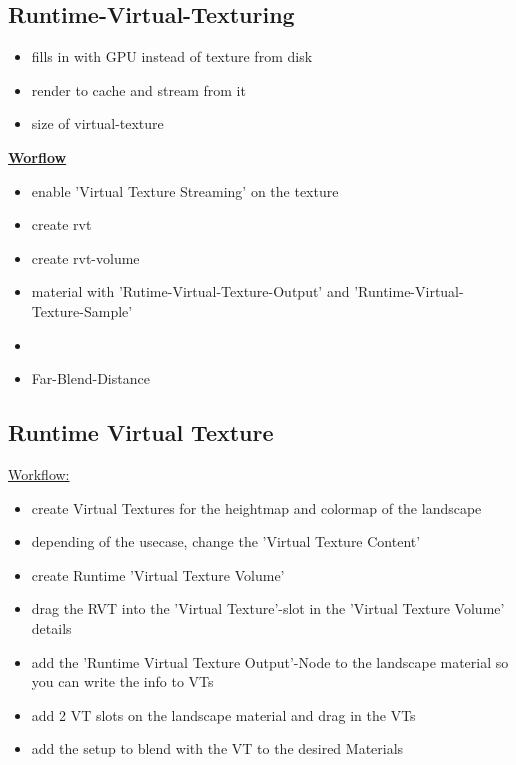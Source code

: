         \subsection{Runtime-Virtual-Texturing}
            \begin{itemize}
                \item fills in with GPU instead of texture from disk
                \item render to cache and stream from it
                \item size of virtual-texture
            \end{itemize}
            \textbf{\underline{Worflow}}
            \begin{itemize}
                \item enable 'Virtual Texture Streaming' on the texture
                \item create rvt
                \item create rvt-volume
                \item material with 'Rutime-Virtual-Texture-Output' and 'Runtime-Virtual-Texture-Sample'
                \item 
                \item Far-Blend-Distance
            \end{itemize}

        \subsection{Runtime Virtual Texture}
            \uline{Workflow:}
            \begin{itemize}
                \item create Virtual Textures for the heightmap and colormap of the landscape
                \item depending of the usecase, change the 'Virtual Texture Content'
                \item create Runtime 'Virtual Texture Volume'
                \item drag the RVT into the 'Virtual Texture'-slot in the 'Virtual Texture Volume' details
                \item add the 'Runtime Virtual Texture Output'-Node to the landscape material so you can write the info to VTs
                \item add 2 VT slots on the landscape material and drag in the VTs
                \item add the setup to blend with the VT to the desired Materials
            \end{itemize}

